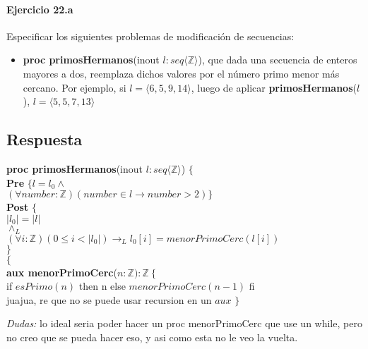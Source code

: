 \documentclass[a4paper]{article}
\begin{document}
\paragraph*{Ejercicio 22.a} Especificar los siguientes problemas de modificación de secuencias:
	\begin{itemize}
		\item \textbf{proc primosHermanos}(inout $l:seq\langle \mathbb{Z}\rangle$), que dada una secuencia de enteros mayores a dos, reemplaza dichos valores por el número primo menor más cercano. Por ejemplo, si $l=\langle 6,5,9,14 \rangle$, luego de aplicar \textbf{primosHermanos}($l$), $l=\langle 5,5,7,13 \rangle$
	\end{itemize}
	
\subsection*{Respuesta}
			
			\textbf{proc primosHermanos}(inout $l:seq\langle \mathbb{Z}\rangle$) $\{$\smallskip \\
			\hspace*{6mm} \textbf{Pre }$\{l=l_0 \wedge$\\
			\hspace*{6mm} $(\forall number:\mathbb{Z})(number\in l \rightarrow
			 number>2)\}$\smallskip \\
			\hspace*{6mm} \textbf{Post }$\{$\\
			\hspace*{6mm} $|l_0|=|l|$\\
			\hspace*{6mm} $\wedge_L$\\
			\hspace*{6mm} $(\forall i:\mathbb{Z})(0\leq i < |l_0|)\rightarrow_L 
				l_0[i]=menorPrimoCerc(l[i])$\\
			\hspace*{6mm} $\}$\\
			$\{$\smallskip \\
			
			\textbf{aux menorPrimoCerc}($n: \mathbb{Z}):\mathbb{Z}
			\ \{$\smallskip \\
			\hspace*{6mm}if $esPrimo(n)$ then n else $menorPrimoCerc(n-1)$ fi\\
			\hspace*{6mm} juajua, re que no se puede usar recursion en un $aux$
			$\}$

\textit{Dudas:} lo ideal seria poder hacer un proc menorPrimoCerc que use un while, pero no creo
que se pueda hacer eso, y asi como esta no le veo la vuelta.
\end{document}
